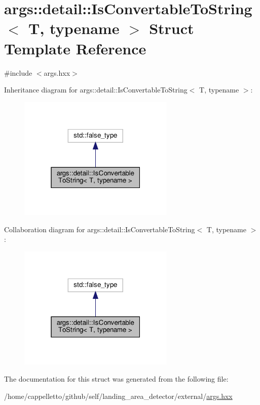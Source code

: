 \hypertarget{structargs_1_1detail_1_1_is_convertable_to_string}{}\section{args\+:\+:detail\+:\+:Is\+Convertable\+To\+String$<$ T, typename $>$ Struct Template Reference}
\label{structargs_1_1detail_1_1_is_convertable_to_string}


{\ttfamily \#include $<$args.\+hxx$>$}



Inheritance diagram for args\+:\+:detail\+:\+:Is\+Convertable\+To\+String$<$ T, typename $>$\+:\nopagebreak
\begin{figure}[H]
\begin{center}
\leavevmode
\includegraphics[width=211pt]{structargs_1_1detail_1_1_is_convertable_to_string__inherit__graph}
\end{center}
\end{figure}


Collaboration diagram for args\+:\+:detail\+:\+:Is\+Convertable\+To\+String$<$ T, typename $>$\+:\nopagebreak
\begin{figure}[H]
\begin{center}
\leavevmode
\includegraphics[width=211pt]{structargs_1_1detail_1_1_is_convertable_to_string__coll__graph}
\end{center}
\end{figure}


The documentation for this struct was generated from the following file\+:\begin{DoxyCompactItemize}
\item 
/home/cappelletto/github/self/landing\+\_\+area\+\_\+detector/external/\hyperlink{args_8hxx}{args.\+hxx}\end{DoxyCompactItemize}
